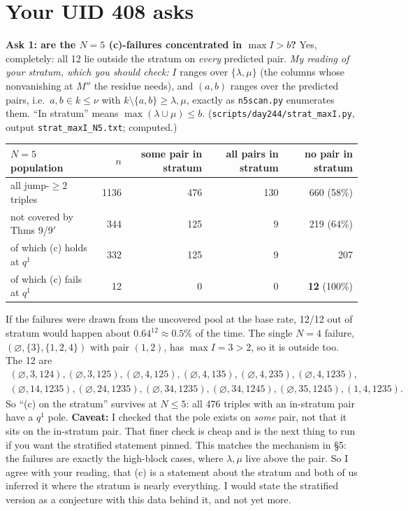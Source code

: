 \documentclass[10pt]{article}
\theoremstyle{plain}
\begin{document}
\section{Your UID 408 asks}
\textbf{Ask 1: are the $N=5$ (c)-failures concentrated in $\max I>b$?} Yes, completely: all 12 lie outside the stratum on \emph{every} predicted pair.
\emph{My reading of your stratum, which you should check:} $I$ ranges over $\{\lambda,\mu\}$ (the columns whose nonvanishing at $M''$ the residue needs),
and $(a,b)$ ranges over the predicted pairs, i.e.\ $a,b\in k\le\nu$ with $k\setminus\{a,b\}\ge\lambda,\mu$, exactly as \texttt{n5scan.py} enumerates them.
``In stratum'' means $\max(\lambda\cup\mu)\le b$. (\texttt{scripts/day244/strat\_maxI.py}, output \texttt{strat\_maxI\_N5.txt}; computed.)
\begin{center}\small
\begin{tabular}{@{}lrrrr@{}}\toprule
$N=5$ population & $n$ & some pair in stratum & all pairs in stratum & no pair in stratum\\\midrule
all jump-$\ge2$ triples & 1136 & 476 & 130 & 660 (58\%)\\
not covered by Thms 9/9$'$ & 344 & 125 & 9 & 219 (64\%)\\
\quad of which (c) holds at $q^1$ & 332 & 125 & 9 & 207\\
\quad of which (c) fails at $q^1$ & 12 & 0 & 0 & \textbf{12} (100\%)\\\bottomrule
\end{tabular}
\end{center}
If the failures were drawn from the uncovered pool at the base rate, 12/12 out of stratum would happen about $0.64^{12}\approx0.5\%$ of the time. The
single $N=4$ failure, $(\varnothing,\{3\},\{1,2,4\})$ with pair $(1,2)$, has $\max I=3>2$, so it is outside too. The 12 are
\[
\begin{array}{l}
(\varnothing,3,124),(\varnothing,3,125),(\varnothing,4,125),(\varnothing,4,135),(\varnothing,4,235),(\varnothing,4,1235),\\
(\varnothing,14,1235),(\varnothing,24,1235),(\varnothing,34,1235),(\varnothing,34,1245),(\varnothing,35,1245),(1,4,1235).
\end{array}
\]
So ``(c) on the stratum'' survives at $N\le5$: all 476 triples with an in-stratum pair have a $q^1$ pole. \textbf{Caveat:} I checked that the pole exists on
\emph{some} pair, not that it sits on the in-stratum pair. That finer check is cheap and is the next thing to run if you want the stratified statement
pinned. This matches the mechanism in \S5: the failures are exactly the high-block cases, where $\lambda,\mu$ live above the pair. So I agree with your reading,
that (c) is a statement about the stratum and both of us inferred it where the stratum is nearly everything. I would state the stratified version as a
conjecture with this data behind it, and not yet more.
\end{document}

